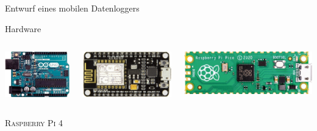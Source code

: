 {\begin{frame}[allowframebreaks]{Entwurf eines mobilen Datenloggers}
\begin{block}{Hardware}
\begin{columns}
            \includegraphics[width=\textwidth]{img/arduino}

            \includegraphics[width=\textwidth]{img/esp8266}

            \includegraphics[width=\textwidth]{img/pi-pico}
        \end{columns}
        \begin{columns}
            \textsc{Raspberry Pi 4}


\end{columns}
\end{block}
\end{frame}}
